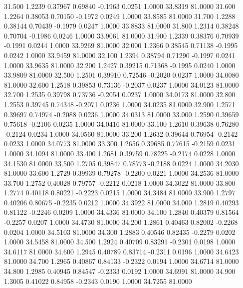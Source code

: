   31.500   1.2239   0.37967   0.69840  -0.1963   0.0251   1.0000  33.8319  81.0000
  31.600   1.2264   0.38053   0.70150  -0.1972   0.0249   1.0000  33.8585  81.0000
  31.700   1.2288   0.38144   0.70439  -0.1979   0.0247   1.0000  33.8833  81.0000
  31.800   1.2314   0.38248   0.70704  -0.1986   0.0246   1.0000  33.9061  81.0000
  31.900   1.2339   0.38376   0.70939  -0.1991   0.0244   1.0000  33.9269  81.0000
  32.000   1.2366   0.38545   0.71138  -0.1995   0.0242   1.0000  33.9459  81.0000
  32.100   1.2394   0.38794   0.71290  -0.1997   0.0241   1.0000  33.9635  81.0000
  32.200   1.2427   0.39215   0.71368  -0.1995   0.0240   1.0000  33.9809  81.0000
  32.500   1.2501   0.39910   0.72546  -0.2020   0.0237   1.0000  34.0080  81.0000
  32.600   1.2518   0.39853   0.73136  -0.2037   0.0237   1.0000  34.0123  81.0000
  32.700   1.2535   0.39798   0.73736  -0.2054   0.0237   1.0000  34.0173  81.0000
  32.800   1.2553   0.39745   0.74348  -0.2071   0.0236   1.0000  34.0235  81.0000
  32.900   1.2571   0.39697   0.74974  -0.2088   0.0236   1.0000  34.0313  81.0000
  33.000   1.2590   0.39659   0.75618  -0.2106   0.0235   1.0000  34.0416  81.0000
  33.100   1.2610   0.39638   0.76280  -0.2124   0.0234   1.0000  34.0560  81.0000
  33.200   1.2632   0.39644   0.76954  -0.2142   0.0233   1.0000  34.0773  81.0000
  33.300   1.2656   0.39685   0.77615  -0.2159   0.0231   1.0000  34.1094  81.0000
  33.400   1.2681   0.39759   0.78225  -0.2174   0.0228   1.0000  34.1530  81.0000
  33.500   1.2705   0.39847   0.78773  -0.2188   0.0224   1.0000  34.2030  81.0000
  33.600   1.2729   0.39939   0.79278  -0.2200   0.0221   1.0000  34.2536  81.0000
  33.700   1.2752   0.40028   0.79757  -0.2212   0.0218   1.0000  34.3022  81.0000
  33.800   1.2774   0.40118   0.80221  -0.2223   0.0215   1.0000  34.3484  81.0000
  33.900   1.2797   0.40206   0.80675  -0.2235   0.0212   1.0000  34.3922  81.0000
  34.000   1.2819   0.40293   0.81122  -0.2246   0.0209   1.0000  34.4336  81.0000
  34.100   1.2840   0.40379   0.81564  -0.2257   0.0207   1.0000  34.4730  81.0000
  34.200   1.2861   0.40463   0.82002  -0.2268   0.0204   1.0000  34.5103  81.0000
  34.300   1.2883   0.40546   0.82435  -0.2279   0.0202   1.0000  34.5458  81.0000
  34.500   1.2924   0.40709   0.83291  -0.2301   0.0198   1.0000  34.6117  81.0000
  34.600   1.2945   0.40789   0.83714  -0.2311   0.0196   1.0000  34.6423  81.0000
  34.700   1.2965   0.40867   0.84133  -0.2322   0.0194   1.0000  34.6714  81.0000
  34.800   1.2985   0.40945   0.84547  -0.2333   0.0192   1.0000  34.6991  81.0000
  34.900   1.3005   0.41022   0.84958  -0.2343   0.0190   1.0000  34.7255  81.0000

